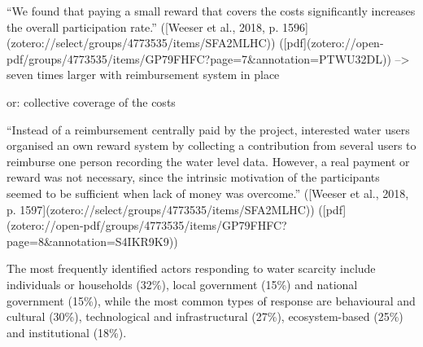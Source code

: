 “We found that paying a small reward that covers the costs significantly increases the overall participation rate.” ([Weeser et al., 2018, p. 1596](zotero://select/groups/4773535/items/SFA2MLHC)) ([pdf](zotero://open-pdf/groups/4773535/items/GP79FHFC?page=7&annotation=PTWU32DL))
--> seven times larger with reimbursement system in place


or: collective coverage of the costs

“Instead of a reimbursement centrally paid by the project, interested water users organised an own reward system by collecting a contribution from several users to reimburse one person recording the water level data. However, a real payment or reward was not necessary, since the intrinsic motivation of the participants seemed to be sufficient when lack of money was overcome.” ([Weeser et al., 2018, p. 1597](zotero://select/groups/4773535/items/SFA2MLHC)) ([pdf](zotero://open-pdf/groups/4773535/items/GP79FHFC?page=8&annotation=S4IKR9K9))

The most frequently identified actors responding to water scarcity include individuals or households (32\%), local government (15\%) and national government (15\%), while the most common types of response are behavioural and cultural (30\%), technological and infrastructural (27\%), ecosystem-based (25\%) and institutional (18\%).


